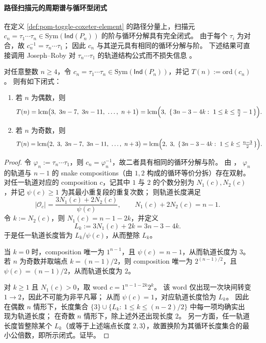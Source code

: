 \paragraph{路径扫描元的周期谱与循环型闭式}
在定义 \ref{def:pom-toggle-coxeter-element} 的路径分量上，扫描元 \(c_n=\tau_1\cdots\tau_n\in \mathrm{Sym}(\mathsf{Ind}(P_n))\) 的阶与循环分解具有完全闭式。
由于每个 \(\tau_i\) 为对合，故 \(c_n^{-1}=\tau_n\cdots\tau_1\)；
因此 \(c_n\) 与其逆元具有相同的循环分解与阶。
下述结果可直接调用 Joseph--Roby 对 \(\tau_n\cdots\tau_1\) 的轨道结构公式而不损失信息 \cite{JosephRoby2018TogglingIndependentSetsPath}。

\begin{theorem}\label{thm:pom-toggle-scan-order-closed-form}
对任意整数 \(n\ge 4\)，令 \(c_n=\tau_1\cdots\tau_n\in\mathrm{Sym}(\mathsf{Ind}(P_n))\)，并记 \(T(n):=\mathrm{ord}(c_n)\)。
则有如下闭式：
\begin{enumerate}
  \item 若 \(n\) 为偶数，则
  \[
  T(n)=\mathrm{lcm}\bigl(3,\ 3n-7,\ 3n-11,\ \dots,\ n+1\bigr)
  =\mathrm{lcm}\Bigl(3,\ \{\,3n-3-4k:\ 1\le k\le \tfrac n2-1\,\}\Bigr).
  \]
  \item 若 \(n\) 为奇数，则
  \[
  T(n)=\mathrm{lcm}\bigl(2,\ 3,\ 3n-7,\ 3n-11,\ \dots,\ n+3\bigr)
  =\mathrm{lcm}\Bigl(2,\ 3,\ \{\,3n-3-4k:\ 1\le k\le \tfrac{n-3}{2}\,\}\Bigr).
  \]
\end{enumerate}
\end{theorem}
\begin{proof}
令 \(\varphi_n:=\tau_n\cdots\tau_1\)，则 \(c_n=\varphi_n^{-1}\)，故二者具有相同的循环分解与阶。
由 \cite[Def.~4.1 \& Prop.~4.3]{JosephRoby2018TogglingIndependentSetsPath}，
\(\varphi_n\) 的轨道与 \(n-1\) 的 snake compositions（由 \(1,2\) 构成的循环等价分拆）存在双射。
对任一轨道对应的 composition \(c\)，记其中 \(1\) 与 \(2\) 的个数分别为 \(N_1(c),N_2(c)\)，并记 \(\psi(c)\ge 1\) 为其最小重复段的重复次数；
则轨道长度满足
\[
|\mathcal O_c|
=\frac{3N_1(c)+2N_2(c)}{\psi(c)},
\qquad
N_1(c)+2N_2(c)=n-1.
\]
令 \(k:=N_2(c)\)，则 \(N_1(c)=n-1-2k\)，并定义
\[
L_k:=3N_1(c)+2k=3n-3-4k.
\]
于是任一轨道长度皆为 \(L_k/\psi(c)\)，从而整除 \(L_k\)。

\par\noindent
当 \(k=0\) 时，composition 唯一为 \(1^{n-1}\)，且 \(\psi(c)=n-1\)，从而轨道长度为 \(3\)。
若 \(n\) 为奇数并取端点 \(k=(n-1)/2\)，则 composition 唯一为 \(2^{(n-1)/2}\)，且 \(\psi(c)=(n-1)/2\)，从而轨道长度为 \(2\)。
\par\noindent
对 \(k\ge 1\) 且 \(N_1(c)>0\)，取 word \(c=1^{n-1-2k}2^k\)。
该 word 仅出现一次块间转变 \(1\to 2\)，因此不可能为非平凡幂；
从而 \(\psi(c)=1\)，对应轨道长度恰为 \(L_k\)。
因此在偶数 \(n\) 情形下，长度集合 \(\{3\}\cup\{L_k:\ 1\le k\le (n-2)/2\}\) 中每一项均确实出现为轨道长度；
在奇数 \(n\) 情形下，除上述外还出现长度 \(2\)。
另一方面，任一轨道长度皆整除某个 \(L_k\)（或等于上述端点长度 \(2,3\)），故置换阶为其循环长度集合的最小公倍数，即所示闭式。证毕。
\end{proof}


